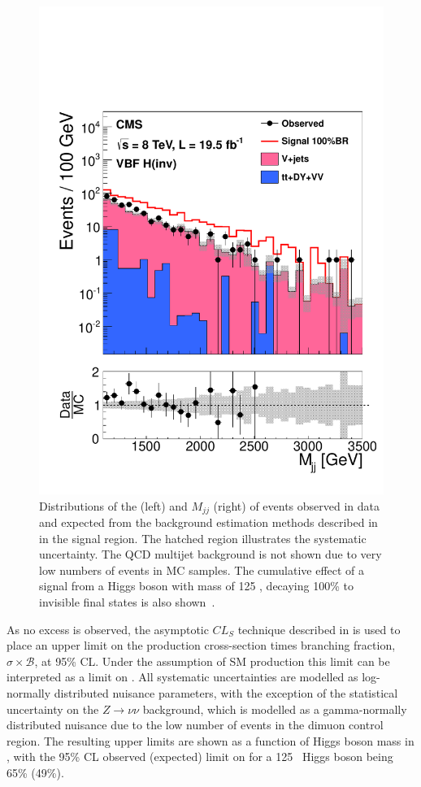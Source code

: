 \begin{figure}
  \includegraphics[width=.6\largefigwidth]{plots/prompt/AN-12-403-figs/SignalRegionMjj.pdf}
  \caption{Distributions of the \MET (left) and $M_{jj}$ (right) of events observed in data and expected from the background estimation methods described in  in the signal region. The hatched region illustrates the systematic uncertainty. The QCD multijet background is not shown due to very low numbers of events in \ac{MC} samples. The cumulative effect of a signal from a Higgs boson with mass of 125 \GeV, decaying 100\% to invisible final states is also shown~\cite{Chatrchyan:2014tja}.}
  \label{fig:promptresults}
\end{figure}

As no excess is observed, the asymptotic $CL_{S}$ technique described in  is used to place an upper limit on the production cross-section times branching fraction, $\sigma\times\mathcal{B}$, at 95\% CL. Under the assumption of \ac{SM} production this limit can be interpreted as a limit on \BRinv. All systematic uncertainties are modelled as log-normally distributed nuisance parameters, with the exception of the statistical uncertainty on the $Z\rightarrow\nu\nu$ background, which is modelled as a gamma-normally distributed nuisance due to the low number of events in the dimuon control region. The resulting upper limits are shown as a function of Higgs boson mass in , with the 95\% CL observed (expected) limit on \BRinv for a 125 \GeV\, Higgs boson being 65\% (49\%).


